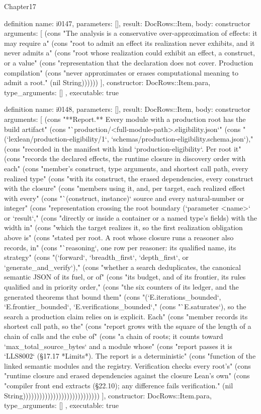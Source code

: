\begin{lexlean}{Chapter17}
\begin{semanticmodule}
definition{
  name: i0147,
  parameters: [],
  result: DocRows::Item,
  body: constructor{
    arguments: [
      (cons "The analysis is a conservative over-approximation of effects: it may require a" (cons "root to admit an effect its realization never exhibits, and it never admits a" (cons "root whose realization could exhibit an effect, a construct, or a value" (cons "representation that the declaration does not cover. Production compilation" (cons "never approximates or erases computational meaning to admit a root." (nil String))))))
    ],
    constructor: DocRows::Item.para,
    type_arguments: []
  },
  executable: true
}

definition{
  name: i0148,
  parameters: [],
  result: DocRows::Item,
  body: constructor{
    arguments: [
      (cons "**Report.** Every module with a production root has the build artifact" (cons "`production/<full-module-path>.eligibility.json`" (cons "(`lexlean/production-eligibility/1`, `schemas/production-eligibility.schema.json`)," (cons "recorded in the manifest with kind `production-eligibility`. Per root it" (cons "records the declared effects, the runtime closure in discovery order with each" (cons "member's construct, type arguments, and shortest call path, every realized type" (cons "with its construct, the erased dependencies, every construct with the closure" (cons "members using it, and, per target, each realized effect with every" (cons "`(construct, instance)` source and every natural-number or integer" (cons "representation crossing the root boundary (`parameter <name>` or `result`," (cons "directly or inside a container or a named type's fields) with the width in" (cons "which the target realizes it, so the first realization obligation above is" (cons "stated per root. A root whose closure runs a reasoner also records, in" (cons "`reasoning`, one row per reasoner: its qualified name, its strategy" (cons "(`forward`, `breadth_first`, `depth_first`, or `generate_and_verify`)," (cons "whether a search deduplicates, the canonical semantic JSON of its fuel, or of" (cons "its budget, and of its frontier, its rules qualified and in priority order," (cons "the six counters of its ledger, and the generated theorems that bound them" (cons "(`E.iterations_bounded`, `E.frontier_bounded`, `E.verifications_bounded`," (cons "`E.saturates`), so the search a production claim relies on is explicit. Each" (cons "member records its shortest call path, so the" (cons "report grows with the square of the length of a chain of calls and the cube of" (cons "a chain of roots; it counts toward `max_total_source_bytes` and a module whose" (cons "report passes it is `LLS8002` (§17.17 *Limits*). The report is a deterministic" (cons "function of the linked semantic modules and the registry. Verification checks every root's" (cons "runtime closure and erased dependencies against the closure Lean's own" (cons "compiler front end extracts (§22.10); any difference fails verification." (nil String))))))))))))))))))))))))))))
    ],
    constructor: DocRows::Item.para,
    type_arguments: []
  },
  executable: true
}


\end{semanticmodule}
\end{lexlean}
